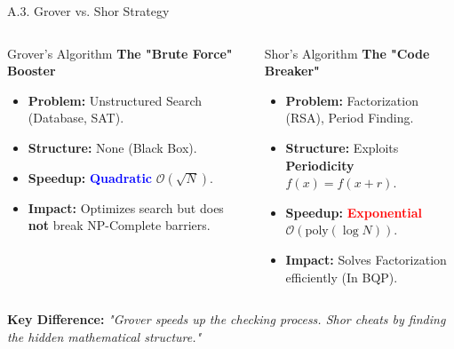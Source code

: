 \documentclass[aspectratio=169, 10pt]{beamer}
\begin{document}
\begin{frame}{A.3. Grover vs. Shor Strategy}
    \begin{columns}[t]
        
        \begin{block}{Grover's Algorithm}
            \centering \textbf{The "Brute Force" Booster}
            \vspace{0.2cm}
            \begin{itemize}
                \item \textbf{Problem:} Unstructured Search (Database, SAT).
                \item \textbf{Structure:} None (Black Box).
                \item \textbf{Speedup:} \textcolor{blue}{\textbf{Quadratic}} $\mathcal{O}(\sqrt{N})$.
                \item \textbf{Impact:} Optimizes search but does \textbf{not} break NP-Complete barriers.
            \end{itemize}
        \end{block}

        \begin{alertblock}{Shor's Algorithm}
            \centering \textbf{The "Code Breaker"}
            \vspace{0.2cm}
            \begin{itemize}
                \item \textbf{Problem:} Factorization (RSA), Period Finding.
                \item \textbf{Structure:} Exploits \textbf{Periodicity} $f(x) = f(x+r)$.
                \item \textbf{Speedup:} \textcolor{red}{\textbf{Exponential}} $\mathcal{O}(\text{poly}(\log N))$.
                \item \textbf{Impact:} Solves Factorization efficiently (In BQP).
            \end{itemize}
        \end{alertblock}
        
    \end{columns}

    \vspace{0.5cm}

    \begin{center}
        \textbf{Key Difference:}
        \textit{"Grover speeds up the checking process. Shor cheats by finding the hidden mathematical structure."}
    \end{center}
\end{frame}
\end{document}
